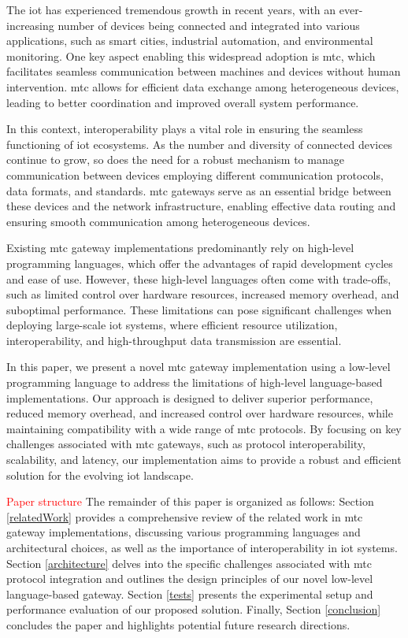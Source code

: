 \documentclass[a4paper,fleqn]{cas-dc}
\begin{document}
The \gls{iot} has experienced tremendous growth in recent years, with an ever-increasing number of devices being connected and integrated into various applications, such as smart cities, industrial automation, and environmental monitoring. One key aspect enabling this widespread adoption is \gls{mtc}, which facilitates seamless communication between machines and devices without human intervention. \gls{mtc} allows for efficient data exchange among heterogeneous devices, leading to better coordination and improved overall system performance.

In this context, interoperability plays a vital role in ensuring the seamless functioning of \gls{iot} ecosystems. As the number and diversity of connected devices continue to grow, so does the need for a robust mechanism to manage communication between devices employing different communication protocols, data formats, and standards. \gls{mtc} gateways serve as an essential bridge between these devices and the network infrastructure, enabling effective data routing and ensuring smooth communication among heterogeneous devices.

Existing \gls{mtc} gateway implementations predominantly rely on high-level programming languages, which offer the advantages of rapid development cycles and ease of use. However, these high-level languages often come with trade-offs, such as limited control over hardware resources, increased memory overhead, and suboptimal performance. These limitations can pose significant challenges when deploying large-scale \gls{iot} systems, where efficient resource utilization, interoperability, and high-throughput data transmission are essential.

In this paper, we present a novel \gls{mtc} gateway implementation using a low-level programming language to address the limitations of high-level language-based implementations. Our approach is designed to deliver superior performance, reduced memory overhead, and increased control over hardware resources, while maintaining compatibility with a wide range of \gls{mtc} protocols. By focusing on key challenges associated with \gls{mtc} gateways, such as protocol interoperability, scalability, and latency, our implementation aims to provide a robust and efficient solution for the evolving \gls{iot} landscape.

\textcolor{red}{Paper structure} The remainder of this paper is organized as follows: Section \ref{relatedWork} provides a comprehensive review of the related work in \gls{mtc} gateway implementations, discussing various programming languages and architectural choices, as well as the importance of interoperability in \gls{iot} systems. Section \ref{architecture} delves into the specific challenges associated with \gls{mtc} protocol integration and outlines the design principles of our novel low-level language-based gateway. Section \ref{tests} presents the experimental setup and performance evaluation of our proposed solution. Finally, Section \ref{conclusion} concludes the paper and highlights potential future research directions.
\end{document}
